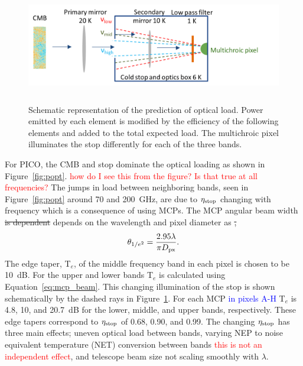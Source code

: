 \documentclass[]{spie}  %
\newcommand{\comr}[1]{\textcolor{red}{#1}}
\newcommand{\comb}[1]{\textcolor{blue}{#1}}
\begin{document}
\begin{figure} [ht]
\begin{center}
\hspace{1cm} \includegraphics[height=5cm]{load_calc_MCP.png}
\end{center}
\caption[load] { \label{fig:load} 
Schematic representation of the prediction of optical load.  Power emitted by each element is modified by the efficiency of 
the following elements and added to the total expected load.  The multichroic pixel illuminates the stop differently for 
each of the three bands. }
\end{figure} 
%

For PICO, the CMB and stop dominate the optical loading as shown in Figure~\ref{fig:popt}.  \comr{how do I see this 
from the figure? Is that true at all frequencies?}
The jumps in load between neighboring bands, seen in Figure~\ref{fig:popt} around 70 and 200~GHz, are 
due to $\eta_{\rm stop}$ changing with frequency which is a consequence of using MCPs.  
The MCP angular beam width \sout{is dependent} depends on the wavelength and pixel diameter as \sout{,}\cite{suzuki2013_thesis}
\begin{equation}
\label{eq:mcp_beam}
\theta_{1/e^2} = \frac{2.95 \lambda}{\pi D_{\rm px}}. 
\end{equation} 
The edge taper, T$_e$, of the middle frequency band in each pixel is chosen to be 10~dB. For the upper and lower bands 
T$_e$ is calculated using Equation~\ref{eq:mcp_beam}. This changing illumination of the stop is shown schematically by 
the dashed rays in Figure~\ref{fig:load}. 
For each MCP \comb{in pixels A-H} T$_e$ is 4.8, 10, and 20.7~dB for the lower, middle, and upper bands, respectively.  These 
edge tapers correspond to $\eta_{\rm stop}$ of 0.68, 0.90, and 0.99.
The changing $\eta_{\rm stop}$ has three main effects; uneven optical load between bands, varying NEP to noise 
equivalent temperature (NET) conversion between bands \comr{this is not an independent effect}, and telescope beam 
size not scaling smoothly with $\lambda$.
\end{document}
